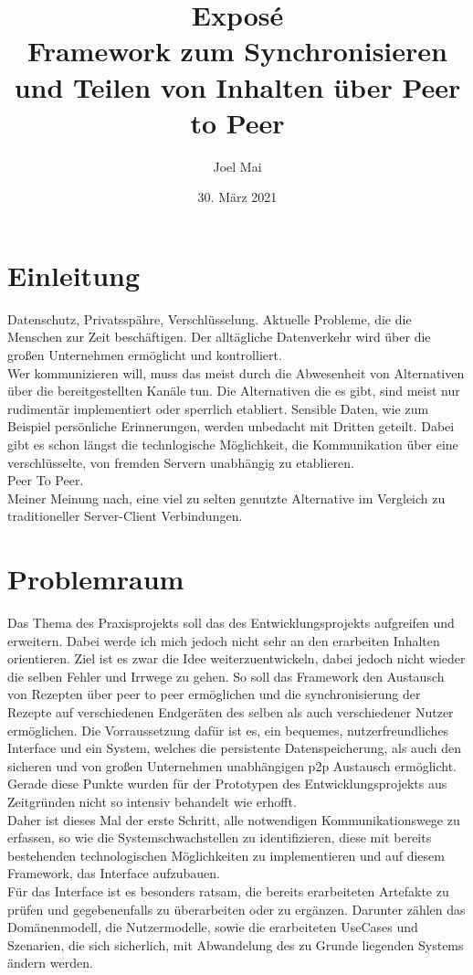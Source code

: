 \documentclass[10pt]{article}
\author{Joel Mai}
\title{Exposé\\ Framework zum Synchronisieren und Teilen von Inhalten über Peer to Peer}
\date{30. März 2021}
\begin{document}
    \maketitle 

    \newpage

    \section{Einleitung}\label{sec:Einleitung}
    Datenschutz, Privatsspähre, Verschlüsselung. Aktuelle Probleme, die die Menschen zur Zeit beschäftigen. Der alltägliche Datenverkehr wird über die großen Unternehmen ermöglicht und kontrolliert\cite{waandfb2021}. \\ 
    Wer kommunizieren will, muss das meist durch die Abwesenheit von Alternativen über die bereitgestellten Kanäle tun. Die Alternativen die es gibt, sind meist nur rudimentär implementiert oder sperrlich etabliert.
    Sensible Daten, wie zum Beispiel persönliche Erinnerungen, werden unbedacht mit Dritten geteilt. Dabei gibt es schon längst die technlogische Möglichkeit, die Kommunikation über eine verschlüsselte, von fremden Servern unabhängig zu etablieren.\\ Peer To Peer.\\ Meiner Meinung nach, eine viel zu selten genutzte Alternative im Vergleich zu traditioneller Server-Client Verbindungen.

    \section{Problemraum}\label{sec:Problemraum}
    Das Thema des Praxisprojekts soll das des Entwicklungsprojekts\cite{cobanmai2021} aufgreifen und erweitern. Dabei werde ich mich jedoch nicht sehr an den erarbeiten Inhalten orientieren. Ziel ist es zwar die Idee weiterzuentwickeln, dabei jedoch nicht wieder die selben Fehler und Irrwege zu gehen. So soll das Framework den Austausch von Rezepten über peer to peer ermöglichen und die synchronisierung der Rezepte auf verschiedenen Endgeräten des selben als auch verschiedener Nutzer ermöglichen. Die Vorraussetzung dafür ist es, ein bequemes, nutzerfreundliches Interface und ein System, welches die persistente Datenspeicherung, als auch den sicheren und von großen Unternehmen unabhängigen p2p Austausch ermöglicht. \\
    Gerade diese Punkte wurden für der Prototypen des Entwicklungsprojekts aus Zeitgründen nicht so intensiv behandelt wie erhofft. \\
    Daher ist dieses Mal der erste Schritt, alle notwendigen Kommunikationswege zu erfassen, so wie die Systemschwachstellen zu identifizieren, diese mit bereits bestehenden technologischen Möglichkeiten zu implementieren und auf diesem Framework, das Interface aufzubauen. \\
    Für das Interface ist es besonders ratsam, die bereits erarbeiteten Artefakte zu prüfen und gegebenenfalls zu überarbeiten oder zu ergänzen. Darunter zählen das Domänenmodell, die Nutzermodelle, sowie die erarbeiteten UseCases und Szenarien, die sich sicherlich, mit Abwandelung des zu Grunde liegenden Systems ändern werden. \\
\end{document}
